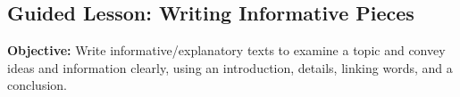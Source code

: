 \documentclass[12pt]{article}
\title{}
\date{}
\begin{document}
\subsection*{Guided Lesson: Writing Informative Pieces}
\onehalfspacing

\begin{tcolorbox}[colframe=black!40, colback=gray!5, 
coltitle=black, colbacktitle=black!20, fonttitle=\bfseries\Large, 
title=Learning Objective, halign title=center, left=5pt, right=5pt, top=5pt, bottom=15pt]
\textbf{Objective:} Write informative/explanatory texts to examine a topic and convey ideas and information clearly, using an introduction, details, linking words, and a conclusion.  
\end{tcolorbox}

\vspace{1em}
\end{document}

